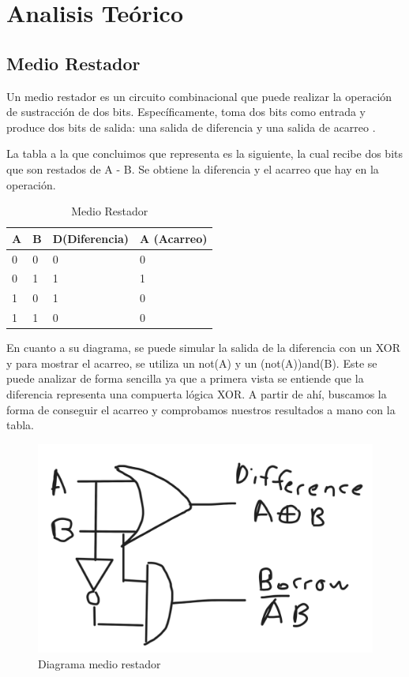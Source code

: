 \documentclass[12pt]{article}  %
\begin{document}
\section*{Analisis Teórico}

\subsection*{Medio Restador}

Un medio restador es un circuito combinacional que puede realizar la operación de sustracción de dos bits. Específicamente, toma dos bits como entrada y produce dos bits de salida: una salida de diferencia y una salida de acarreo \cite{9622531}.

La tabla a la que concluimos que representa es la siguiente, la cual recibe dos bits que son restados de A - B. Se obtiene la diferencia y el acarreo que hay en la operación.

\begin{table}[!ht]
    \centering
    \caption{Medio Restador}
    \begin{tabular}{|l|l|l|l|}
    \hline
        A & B & D(Diferencia) & A (Acarreo) \\ \hline
        0 & 0 & 0 & 0 \\ \hline
        0 & 1 & 1 & 1 \\ \hline
        1 & 0 & 1 & 0 \\ \hline
        1 & 1 & 0 & 0 \\ \hline
    \end{tabular}
\end{table}

En cuanto a su diagrama, se puede simular la salida de la diferencia con un XOR y para mostrar el acarreo, se utiliza un not(A) y un (not(A))and(B). Este se puede analizar de forma sencilla ya que a primera vista se entiende que la diferencia representa una compuerta lógica XOR. A partir de ahí, buscamos la forma de conseguir el acarreo y comprobamos nuestros resultados a mano con la tabla.

\begin{figure}[!ht]
    \centering
    \caption{Diagrama medio restador}
    \includegraphics[width=0.25\linewidth]{Imagenes/Schemes/medio-restador.png}
\end{figure}
\newpage
\end{document}
